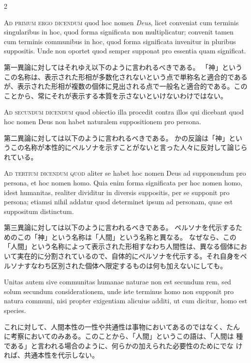 \documentclass[paper=a4paper,fontsize=10pt,jafontsize=9pt,titlepage]{jlreq}
\begin{document}
\begin{paracol}{2}
\switchcolumn*

\textsc{Ad primum ergo dicendum} quod hoc nomen \textit{Deus}, licet conveniat cum
terminis singularibus in hoc, quod forma significata non multiplicatur;
convenit tamen cum terminis communibus in hoc, quod forma significata
invenitur in pluribus suppositis. Unde non oportet quod semper supponat
pro essentia quam significat.

\switchcolumn

第一異論に対してはそれゆえ以下のように言われるべきである。
「神」というこの名称は、表示された形相が多数化されないという点で単称名と適合的であるが、表示された形相が複数の個体に見出される点で一般名と適合的である。このことから、常にそれが表示する本質を示さないといけないわけではない。

\switchcolumn*

\textsc{Ad secundum dicendum} quod obiectio illa procedit contra illos qui
dicebant quod hoc nomen Deus non habet naturalem suppositionem pro
persona.

\switchcolumn

第二異論に対しては以下のように言われるべきである。
かの反論は「神」というこの名称が本性的にペルソナを示すことがないと言った人々に反対して論じられている。

\switchcolumn*

\textsc{Ad tertium dicendum quod} aliter se habet hoc nomen Deus ad supponendum
pro persona, et hoc nomen homo. Quia enim forma significata per hoc
nomen homo, idest humanitas, realiter dividitur in diversis suppositis,
per se supponit pro persona; etiamsi nihil addatur quod determinet ipsum
ad personam, quae est suppositum distinctum.

\switchcolumn

第三異論に対しては以下のように言われるべきである。
ペルソナを代示するためのこの「神」という名称は「人間」という名称と異なる。
なぜなら、この「人間」という名称によって表示された形相すなわち人間性は、異なる個体において実在的に分割されているので、自体的にペルソナを代示する。それ自身をペルソナすなわち区別された個体へ限定するものは何も加えないにしても。

\switchcolumn*

Unitas autem sive
communitas humanae naturae non est secundum rem, sed solum secundum
considerationem, unde iste terminus homo non supponit pro natura
communi, nisi propter exigentiam alicuius additi, ut cum dicitur, homo
est species.

\switchcolumn

これに対して、人間本性の一性や共通性は事物においてあるのではなく、たん
に考察においてのみある。このことから、「人間」というこの語は、「人間は
種である」と言われる場合のように、何らかの加えられた必要性のためにでな
ければ、共通本性を代示しない。


\end{paracol}
\end{document}
